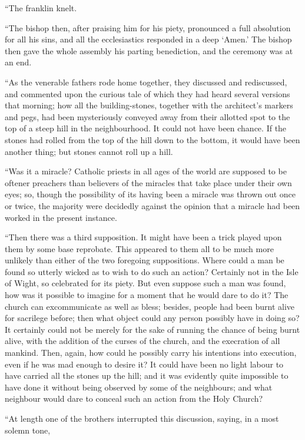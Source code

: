 \documentclass[
  12pt,
  a5paper,
  twoside]{book}
\begin{document}
``The franklin knelt.

``The bishop then, after praising him for his piety, pronounced a full
absolution for all his sins, and all the ecclesiastics responded in a
deep `Amen.' The bishop then gave the whole assembly his parting
benediction, and the ceremony was at an end.

``As the venerable fathers rode home together, they discussed and
rediscussed, and commented upon the curious tale of which they had heard
several versions that morning; how all the building-stones, together
with the architect's markers and pegs, had been mysteriously conveyed
away from their allotted spot to the top of a steep hill in the
neighbourhood. It could not have been chance. If the stones had rolled
from the top of the hill down to the bottom, it would have been another
thing; but stones cannot roll up a hill.

``Was it a miracle? Catholic priests in all ages of the world are
supposed to be oftener preachers than believers of the miracles that
take place under their own eyes; so, though the possibility of its
having been a miracle was thrown out once or twice, the majority were
decidedly against the opinion that a miracle had been worked in the
present instance.

``Then there was a third supposition. It might have been a trick played
upon them by some base reprobate. This appeared to them all to be much
more unlikely than either of the two foregoing suppositions. Where could
a man be found so utterly wicked as to wish to do such an action?
Certainly not in the Isle of Wight, so celebrated for its piety. But
even suppose such a man was found, how was it possible to imagine for a
moment that he would dare to do it? The church can excommunicate as well
as bless; besides, people had been burnt alive for sacrilege before;
then what object could any person possibly have in doing so? It
certainly could not be merely for the sake of running the chance of
being burnt alive, with the addition of the curses of the church, and
the execration of all mankind. Then, again, how could he possibly carry
his intentions into execution, even if he was mad enough to desire it?
It could have been no light labour to have carried all the stones up the
hill; and it was evidently quite impossible to have done it without
being observed by some of the neighbours; and what neighbour would dare
to conceal such an action from the Holy Church?

``At length one of the brothers interrupted this discussion, saying, in
a most solemn tone,
\end{document}
